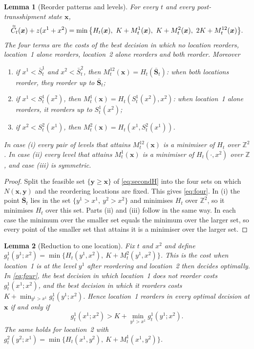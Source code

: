 \documentclass[11pt]{article}
\DeclareRobustCommand{\dbtilde}[1]{\accentset{\approx}{#1}}
\renewcommand{\vec}[1]{\boldsymbol{#1}}
\newcommand{\Z}{\mathbb{Z}}
\newcommand{\Cq}{\dbtilde{C}}
\newtheorem{lemma}{Lemma}
\theoremstyle{definition}
\begin{document}
\begin{lemma}[Reorder patterns and levels]\label{lem:patterns}
For every $t$ and every post-transshipment state $\vec{x}$,
\begin{equation}\label{eq:four}
\Cq_t(\vec{x})+z(x^1+x^2)=\min\big\{H_t(\vec{x}),\ K+M^1_t(\vec{x}),\ K+M^2_t(\vec{x}),\ 2K+M^{12}_t(\vec{x})\big\}.
\end{equation}
The four terms are the costs of the best decision in which no location reorders, location~1 alone reorders, location~2 alone reorders and both reorder. Moreover
\begin{enumerate}[label=(\roman*)]
\item if $x^1<\bar S^1_t$ and $x^2<\bar S^2_t$, then $M^{12}_t(\vec{x})=H_t(\bar{\vec{S}}_t)$: when both locations reorder, they reorder up to $\bar{\vec{S}}_t$;
\item if $x^1<S^1_t(x^2)$, then $M^1_t(\vec{x})=H_t(S^1_t(x^2),x^2)$: when location~1 alone reorders, it reorders up to $S^1_t(x^2)$;
\item if $x^2<S^2_t(x^1)$, then $M^2_t(\vec{x})=H_t(x^1,S^2_t(x^1))$.
\end{enumerate}
In case (i) every pair of levels that attains $M^{12}_t(\vec{x})$ is a minimiser of $H_t$ over $\Z^2$. In case (ii) every level that attains $M^1_t(\vec{x})$ is a minimiser of $H_t(\cdot,x^2)$ over $\Z$, and case (iii) is symmetric.
\end{lemma}

\begin{proof}
Split the feasible set $\{\vec{y}\ge\vec{x}\}$ of \eqref{eq:secondH} into the four sets on which $N(\vec{x},\vec{y})$ and the reordering locations are fixed. This gives \eqref{eq:four}. In (i) the point $\bar{\vec{S}}_t$ lies in the set $\{y^1>x^1,\ y^2>x^2\}$ and minimises $H_t$ over $\Z^2$, so it minimises $H_t$ over this set. Parts (ii) and (iii) follow in the same way. In each case the minimum over the smaller set equals the minimum over the larger set, so every point of the smaller set that attains it is a minimiser over the larger set.
\end{proof}

\begin{lemma}[Reduction to one location]\label{lem:reduction}
Fix $t$ and $x^2$ and define $g^1_t(y^1;x^2)=\min\{H_t(y^1,x^2),\ K+M^2_t(y^1,x^2)\}$. This is the cost when location~1 is at the level $y^1$ after reordering and location~2 then decides optimally. In \eqref{eq:four}, the best decision in which location~1 does not reorder costs $g^1_t(x^1;x^2)$, and the best decision in which it reorders costs $K+\min_{y^1>x^1}g^1_t(y^1;x^2)$. Hence location~1 reorders in every optimal decision at $\vec{x}$ if and only if
\begin{equation}\label{eq:reorder1}
g^1_t(x^1;x^2)>K+\min_{y^1>x^1}g^1_t(y^1;x^2).
\end{equation}
The same holds for location~2 with $g^2_t(y^2;x^1)=\min\{H_t(x^1,y^2),\ K+M^1_t(x^1,y^2)\}$.
\end{lemma}
\end{document}
